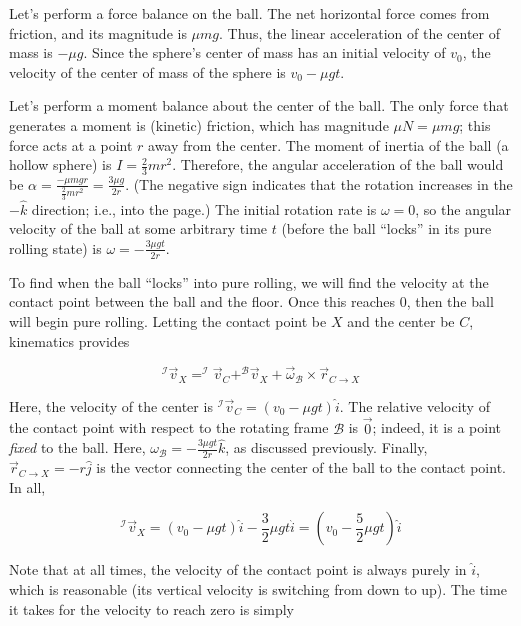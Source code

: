 \documentclass[12pt]{article}
\begin{document}
\vspace{2 \baselineskip}



Let's perform a force balance on the ball. The net horizontal force comes from friction, and its magnitude is $\mu m g$. Thus, the linear acceleration of the center of mass is $-\mu g$. Since the sphere's center of mass has an initial velocity of $v_0$, the velocity of the center of mass of the sphere is $v_0 - \mu g t$.

Let's perform a moment balance about the center of the ball. The only force that generates a moment is (kinetic) friction, which has magnitude $\mu N = \mu m g$; this force acts at a point $r$ away from the center. The moment of inertia of the ball (a hollow sphere) is $I = \frac{2}{3} m r^2$. Therefore, the angular acceleration of the ball would be $\alpha = \frac{-\mu m g r}{\frac{2}{3} m r^2} = \frac{3 \mu g}{2 r}$. (The negative sign indicates that the rotation increases in the $-\hat{k}$ direction; i.e., into the page.) The initial rotation rate is $\omega = 0$, so the angular velocity of the ball at some arbitrary time $t$ (before the ball ``locks'' in its pure rolling state) is $\omega = -\frac{3 \mu g t}{2 r}$.

To find when the ball ``locks'' into pure rolling, we will find the velocity at the contact point between the ball and the floor. Once this reaches $0$, then the ball will begin pure rolling. Letting the contact point be $X$ and the center be $C$, kinematics provides

$$^\mathcal{I} \vec{v}_X = ^\mathcal{I} \vec{v}_C + ^\mathcal{B} \vec{v}_X + \vec{\omega}_\mathcal{B} \times \vec{r}_{C \to X}$$

Here, the velocity of the center is $^\mathcal{I} \vec{v}_C = (v_0 - \mu g t) \hat{i}$. The relative velocity of the contact point with respect to the rotating frame $\mathcal{B}$ is $\vec{0}$; indeed, it is a point \textit{fixed} to the ball. Here, $\omega_\mathcal{B} = -\frac{3 \mu g t}{2 r} \hat{k}$, as discussed previously. Finally, $\vec{r}_{C \to X} = -r \hat{j}$ is the vector connecting the center of the ball to the contact point. In all,

$$^\mathcal{I} \vec{v}_X = (v_0 - \mu g t) \hat{i} - \frac{3}{2} \mu g t \hat{i} = \left( v_0 - \frac{5}{2} \mu g t \right) \hat{i}$$

Note that at all times, the velocity of the contact point is always purely in $\hat{i}$, which is reasonable (its vertical velocity is switching from down to up). The time it takes for the velocity to reach zero is simply
\end{document}
